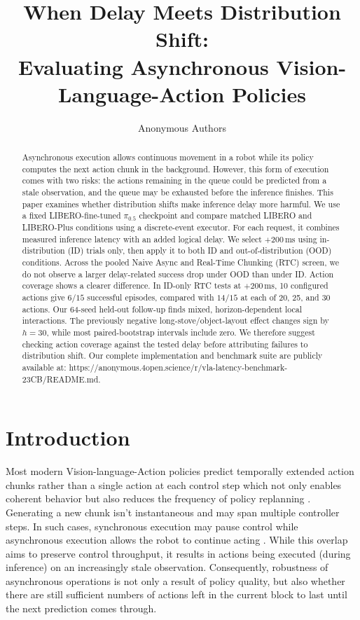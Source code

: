 \documentclass{article}
\title{When Delay Meets Distribution Shift:\\ Evaluating Asynchronous Vision-Language-Action Policies}
\author{%
  Anonymous Authors \\
}
\begin{document}
\maketitle

\begin{abstract}
Asynchronous execution allows continuous movement in a robot while its policy computes the next action chunk in the background. However, this form of execution comes with two risks: the actions remaining in the queue could be predicted from a stale observation, and the queue may be exhausted before the inference finishes. This paper examines whether distribution shifts make inference delay more harmful. We use a fixed LIBERO-fine-tuned $\pi_{0.5}$ checkpoint and compare matched LIBERO and LIBERO-Plus conditions using a discrete-event executor. For each request, it combines measured inference latency with an added logical delay. We select $+200\,\mathrm{ms}$ using in-distribution (ID) trials only, then apply it to both ID and out-of-distribution (OOD) conditions. Across the pooled Naive Async and Real-Time Chunking (RTC) screen, we do not observe a larger delay-related success drop under OOD than under ID. Action coverage shows a clearer difference. In ID-only RTC tests at $+200\,\mathrm{ms}$, 10 configured actions give $6/15$ successful episodes, compared with $14/15$ at each of 20, 25, and 30 actions. Our 64-seed held-out follow-up finds mixed, horizon-dependent local interactions. The previously negative long-stove/object-layout effect changes sign by $h=30$, while most paired-bootstrap intervals include zero. We therefore suggest checking action coverage against the tested delay before attributing failures to distribution shift. Our complete implementation and benchmark suite are publicly available at: https://anonymous.4open.science/r/vla-latency-benchmark-23CB/README.md.



\end{abstract}


\section{Introduction}

    Most modern Vision-language-Action policies predict temporally extended action chunks rather than a single action at each control step which not only enables coherent behavior but also reduces the frequency of policy replanning \cite{1}\cite{2}. Generating a new chunk isn't instantaneous and may span multiple controller steps. In such cases, synchronous execution may pause control while asynchronous execution allows the robot to continue acting \cite{3}. While  this overlap aims to preserve control throughput, it results in actions being executed (during inference) on an increasingly stale observation. Consequently, robustness of asynchronous operations is not only a result of policy quality, but also whether there are still sufficient numbers of actions left in the current block to last until the next prediction comes through.
\end{document}
